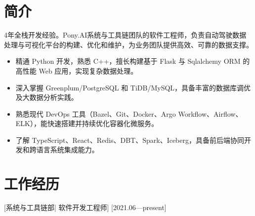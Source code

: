 \documentclass{resume}
\begin{document}


\ResumeTitle


\section{简介}

\textnormal{4年全栈开发经验。Pony.AI系统与工具链团队的软件工程师，负责自动驾驶数据处理与可视化平台的构建、优化和维护，为业务团队提供高效、可靠的数据支撑。}
\begin{itemize}
  \item 精通 Python 开发，熟悉 C++，擅长构建基于 Flask 与 Sqlalchemy ORM 的高性能 Web 应用，实现复杂数据处理。
  \item 深入掌握 Greenplum/PostgreSQL 和 TiDB/MySQL，具备丰富的数据库调优及大数据分析实践。
  \item 熟悉现代 DevOps 工具（Bazel、Git、Docker、Argo Workflow、Airflow、ELK），能快速搭建并持续优化容器化微服务。
  \item 了解 TypeScript、React、Redis、DBT、Spark、Iceberg，具备前后端协同开发和跨语言系统集成能力。
\end{itemize}

\section{工作经历}

[\textnormal{系统与工具链部|} 软件开发工程师]
[2021.06—present]
\end{document}
